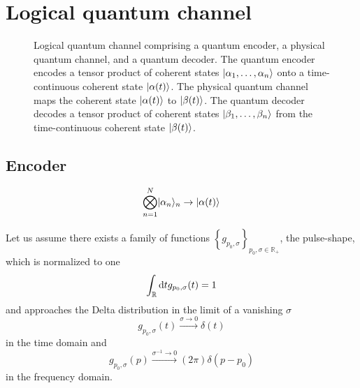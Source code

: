 \section{Logical quantum channel}

\begin{figure}[htb]
	\centering
	
	\caption{Logical quantum channel comprising a quantum encoder, a physical quantum channel, and a quantum decoder. The quantum encoder encodes a tensor product of coherent states $\lvert\alpha_1,\dots,\alpha_n\rangle$ onto a time-continuous coherent state $\lvert\alpha(t)\rangle$. The physical quantum channel maps the coherent state $\lvert\alpha(t)\rangle$ to $\lvert\beta(t)\rangle$. The quantum decoder decodes a tensor product of coherent states $\lvert\beta_1,\dots,\beta_n\rangle$ from the time-continuous coherent state $\lvert\beta(t)\rangle$.}
\end{figure}

\subsection{Encoder}

\begin{equation}
	\bigotimes_{n=1}^N
	\lvert\alpha_n\rangle_n
	\to
	\lvert\alpha(t)\rangle
\end{equation}

Let us assume there exists a family of functions $\left\{g_{p_0,\sigma}\right\}_{p_0,\sigma\in\mathbb{R}_+}$, the pulse-shape, which is normalized to one
\begin{equation}
	\int_{\mathbb{R}}
	\odif{t}
	g_{p_0,\sigma}(t)
	=
	1	
\end{equation}
and approaches the Delta distribution in the limit of a vanishing $\sigma$
\begin{equation}
	g_{p_0,\sigma}(t)
	\xrightarrow{\sigma\to0}
	\delta(t)
\end{equation}
in the time domain and
\begin{equation}
	g_{p_0,\sigma}(p)
	\xrightarrow{\sigma^{-1}\to0}
	(2\pi)
	\delta(p-p_0)
\end{equation}
in the frequency domain.

